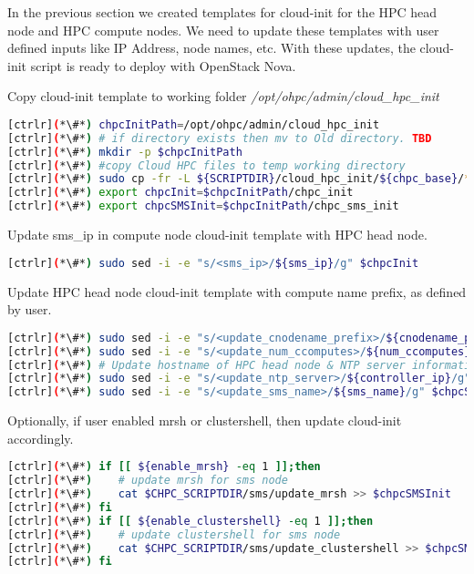 	In the previous section we created templates for cloud-init for the HPC head node and HPC compute nodes. We need to update these templates with user defined inputs like IP Address, node names, etc. With these updates, the cloud-init script is ready to deploy with OpenStack Nova.

	Copy cloud-init template to working folder {\em /opt/ohpc/admin/cloud\_hpc\_init }


\begin{lstlisting}[language=bash,keywords={}]
[ctrlr](*\#*) chpcInitPath=/opt/ohpc/admin/cloud_hpc_init
[ctrlr](*\#*) # if directory exists then mv to Old directory. TBD
[ctrlr](*\#*) mkdir -p $chpcInitPath
[ctrlr](*\#*) #copy Cloud HPC files to temp working directory
[ctrlr](*\#*) sudo cp -fr -L ${SCRIPTDIR}/cloud_hpc_init/${chpc_base}/* $chpcInitPath
[ctrlr](*\#*) export chpcInit=$chpcInitPath/chpc_init
[ctrlr](*\#*) export chpcSMSInit=$chpcInitPath/chpc_sms_init
\end{lstlisting}

	Update sms\_ip in compute node cloud-init template with HPC head node. 
	
\begin{lstlisting}[language=bash,keywords={}]
[ctrlr](*\#*) sudo sed -i -e "s/<sms_ip>/${sms_ip}/g" $chpcInit
\end{lstlisting}

	Update HPC head node cloud-init template with compute name prefix, as defined by user.

\begin{lstlisting}[language=bash,keywords={}]
[ctrlr](*\#*) sudo sed -i -e "s/<update_cnodename_prefix>/${cnodename_prefix}/g" $chpcSMSInit
[ctrlr](*\#*) sudo sed -i -e "s/<update_num_ccomputes>/${num_ccomputes}/g" $chpcSMSInit
[ctrlr](*\#*) # Update hostname of HPC head node & NTP server information
[ctrlr](*\#*) sudo sed -i -e "s/<update_ntp_server>/${controller_ip}/g" $chpcSMSInit
[ctrlr](*\#*) sudo sed -i -e "s/<update_sms_name>/${sms_name}/g" $chpcSMSInit
\end{lstlisting}

	Optionally, if user enabled mrsh or clustershell, then update cloud-init accordingly.

\begin{lstlisting}[language=bash,keywords={}]
[ctrlr](*\#*) if [[ ${enable_mrsh} -eq 1 ]];then
[ctrlr](*\#*)    # update mrsh for sms node
[ctrlr](*\#*)    cat $CHPC_SCRIPTDIR/sms/update_mrsh >> $chpcSMSInit
[ctrlr](*\#*) fi
[ctrlr](*\#*) if [[ ${enable_clustershell} -eq 1 ]];then
[ctrlr](*\#*)    # update clustershell for sms node
[ctrlr](*\#*)    cat $CHPC_SCRIPTDIR/sms/update_clustershell >> $chpcSMSInit
[ctrlr](*\#*) fi
\end{lstlisting}
